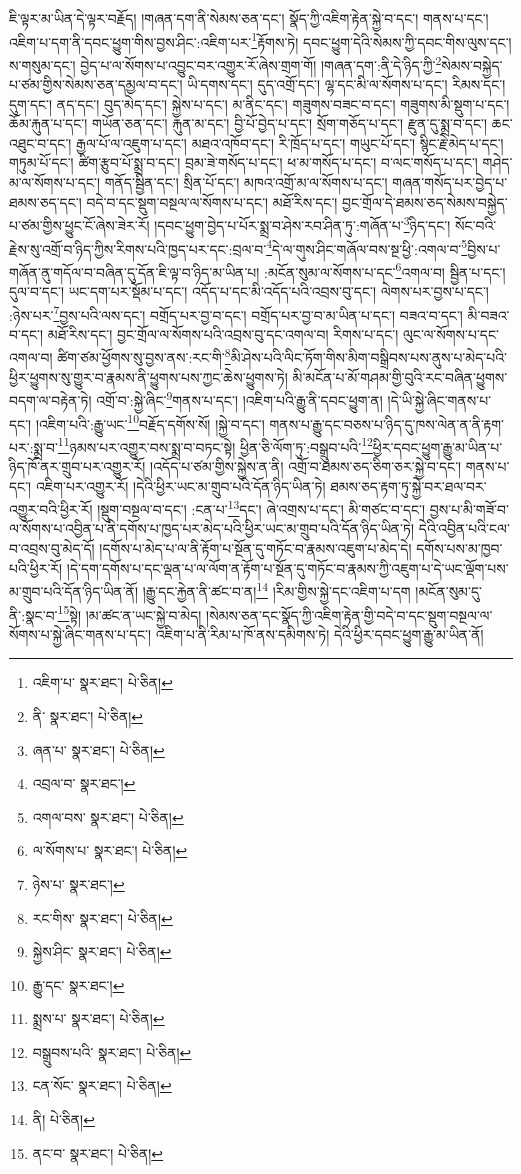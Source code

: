 ཇི་ལྟར་མ་ཡིན་དེ་ལྟར་བརྗོད། །གཞན་དག་ནི་སེམས་ཅན་དང་། སྣོད་ཀྱི་འཇིག་རྟེན་སྐྱེ་བ་དང་། གནས་པ་དང་། འཇིག་པ་དག་ནི་དབང་ཕྱུག་གིས་བྱས་ཤིང་:འཇིག་པར་\footnote{འཇིག་པ་  སྣར་ཐང་།  པེ་ཅིན། }རྟོགས་ཏེ། དབང་ཕྱུག་དེའི་སེམས་ཀྱི་དབང་གིས་ལུས་དང་། ས་གསུམ་དང་། བྱེད་པ་ལ་སོགས་པ་འབྱུང་བར་འགྱུར་རོ་ཞེས་གྲག་གོ། །གཞན་དག་:ནི་དེ་ཉིད་ཀྱི་\footnote{ནི་  སྣར་ཐང་།  པེ་ཅིན། }སེམས་བསྐྱེད་པ་ཙམ་གྱིས་སེམས་ཅན་དམྱལ་བ་དང་། ཡི་དགས་དང་། དུད་འགྲོ་དང་། ལྷ་དང་མི་ལ་སོགས་པ་དང་། རིམས་དང་། དུག་དང་། ནད་དང་། བུད་མེད་དང་། སྐྱེས་པ་དང་། མ་ནིང་དང་། གཟུགས་བཟང་བ་དང་། གཟུགས་མི་སྡུག་པ་དང་། ཆོམ་རྐུན་པ་དང་། གཡོན་ཅན་དང་། རྐུན་མ་དང་། བྱི་པོ་བྱེད་པ་དང་། སྲོག་གཅོད་པ་དང་། རྫུན་དུ་སྨྲ་བ་དང་། ཆང་འཐུང་བ་དང་། རྒྱལ་པོ་ལ་འཇུག་པ་དང་། མཐའ་འཁོབ་དང་། རི་ཁྲོད་པ་དང་། གཡུང་པོ་དང་། སྙིང་རྗེ་མེད་པ་དང་། གཏུམ་པོ་དང་། ཚིག་རྩུབ་པོ་སྨྲ་བ་དང་། བྲམ་ཟེ་གསོད་པ་དང་། ཕ་མ་གསོད་པ་དང་། བ་ལང་གསོད་པ་དང་། གཤེད་མ་ལ་སོགས་པ་དང་། གནོད་སྦྱིན་དང་། སྲིན་པོ་དང་། མཁའ་འགྲོ་མ་ལ་སོགས་པ་དང་། གཞན་གསོད་པར་བྱེད་པ་ཐམས་ཅད་དང་། བདེ་བ་དང་སྡུག་བསྔལ་ལ་སོགས་པ་དང་། མཐོ་རིས་དང་། བྱང་གྲོལ་དེ་ཐམས་ཅད་སེམས་བསྐྱེད་པ་ཙམ་གྱིས་ཕྱུང་ངོ་ཞེས་ཟེར་རོ། །དབང་ཕྱུག་བྱེད་པ་པོར་སྨྲ་བ་ཤེས་རབ་ཤིན་ཏུ་:གཞོན་པ་\footnote{ཞན་པ་  སྣར་ཐང་།  པེ་ཅིན། }ཉིད་དང་། སོང་བའི་རྗེས་སུ་འགྲོ་བ་ཉིད་ཀྱིས་རིགས་པའི་ཁྱད་པར་དང་:བྲལ་བ་\footnote{འབྲལ་བ་  སྣར་ཐང་། }དེ་ལ་གུས་ཤིང་གཞོལ་བས་སྔ་ཕྱི་:འགལ་བ་\footnote{འགལ་བས་  སྣར་ཐང་།  པེ་ཅིན། }བྱིས་པ་གཞོན་ནུ་གདོལ་བ་བཞིན་དུ་དོན་ཇི་ལྟ་བ་ཉིད་མ་ཡིན་པ། :མངོན་སུམ་ལ་སོགས་པ་དང་\footnote{ལ་སོགས་པ་  སྣར་ཐང་།  པེ་ཅིན། }འགལ་བ། སྦྱིན་པ་དང་། དུལ་བ་དང་། ཡང་དག་པར་སྡོམ་པ་དང་། འདོད་པ་དང་མི་འདོད་པའི་འབྲས་བུ་དང་། ལེགས་པར་བྱས་པ་དང་། :ཉེས་པར་\footnote{ཉེས་པ་  སྣར་ཐང་། }བྱས་པའི་ལས་དང་། བགྲོད་པར་བྱ་བ་དང་། བགྲོད་པར་བྱ་བ་མ་ཡིན་པ་དང་། བཟའ་བ་དང་། མི་བཟའ་བ་དང་། མཐོ་རིས་དང་། བྱང་གྲོལ་ལ་སོགས་པའི་འབྲས་བུ་དང་འགལ་བ། རིགས་པ་དང་། ལུང་ལ་སོགས་པ་དང་འགལ་བ། ཚིག་ཙམ་ཕྱོགས་སུ་བྱས་ནས་:རང་གི་\footnote{རང་གིས་  སྣར་ཐང་།  པེ་ཅིན། }མི་ཤེས་པའི་ལིང་ཏོག་གིས་མིག་བསྒྲིབས་པས་ནུས་པ་མེད་པའི་ཕྱིར་ཕྱུགས་སུ་གྱུར་བ་རྣམས་ནི་ཕྱུགས་པས་ཀྱང་ཆེས་ཕྱུགས་ཏེ། མི་མངོན་པ་མོ་གཤམ་གྱི་བུའི་རང་བཞིན་ཕྱུགས་བདག་ལ་བརྟེན་ཏེ། འགྲོ་བ་:སྐྱེ་ཞིང་\footnote{སྐྱེས་ཤིང་  སྣར་ཐང་།  པེ་ཅིན། }གནས་པ་དང་། །འཇིག་པའི་རྒྱུ་ནི་དབང་ཕྱུག་ན། །དེ་ཡི་སྐྱེ་ཞིང་གནས་པ་དང་། །འཇིག་པའི་:རྒྱུ་ཡང་\footnote{རྒྱུ་དང་  སྣར་ཐང་། }བརྗོད་དགོས་སོ། །སྐྱེ་བ་དང་། གནས་པ་རྒྱུ་དང་བཅས་པ་ཉིད་དུ་ཁས་ལེན་ན་ནི་རྟག་པར་:སྨྲ་བ་\footnote{སྨྲས་པ་  སྣར་ཐང་།  པེ་ཅིན། }ཉམས་པར་འགྱུར་བས་སྨྲ་བ་བཏང་སྟེ། ཕྱིན་ཅི་ལོག་ཏུ་:བསྒྲུབ་པའི་\footnote{བསྒྲུབས་པའི་  སྣར་ཐང་།  པེ་ཅིན། }ཕྱིར་དབང་ཕྱུག་རྒྱུ་མ་ཡིན་པ་ཉིད་ཁོ་ནར་གྲུབ་པར་འགྱུར་རོ། །འདོད་པ་ཙམ་གྱིས་སྐྱེས་ན་ནི། འགྲོ་བ་ཐམས་ཅད་ཅིག་ཅར་སྐྱེ་བ་དང་། གནས་པ་དང་། འཇིག་པར་འགྱུར་རོ། །དེའི་ཕྱིར་ཡང་མ་གྲུབ་པའི་དོན་ཉིད་ཡིན་ཏེ། ཐམས་ཅད་རྟག་ཏུ་སྐྱེ་བར་ཐལ་བར་འགྱུར་བའི་ཕྱིར་རོ། །སྡུག་བསྔལ་བ་དང་། :ངན་པ་\footnote{ངན་སོང་  སྣར་ཐང་།  པེ་ཅིན། }དང་། ཞེ་འགྲས་པ་དང་། མི་གཙང་བ་དང་། བྱས་པ་མི་གཟོ་བ་ལ་སོགས་པ་འབྱིན་པ་ནི་དགོས་པ་ཁྱད་པར་མེད་པའི་ཕྱིར་ཡང་མ་གྲུབ་པའི་དོན་ཉིད་ཡིན་ཏེ། དེའི་འབྱིན་པའི་ངལ་བ་འབྲས་བུ་མེད་དོ། །དགོས་པ་མེད་པ་ལ་ནི་རྟོག་པ་སྔོན་དུ་གཏོང་བ་རྣམས་འཇུག་པ་མེད་དེ། དགོས་པས་མ་ཁྱབ་པའི་ཕྱིར་རོ། །དེ་དག་དགོས་པ་དང་ལྡན་པ་ལ་ལོག་ན་རྟོག་པ་སྔོན་དུ་གཏོང་བ་རྣམས་ཀྱི་འཇུག་པ་དེ་ཡང་ལྡོག་པས་མ་གྲུབ་པའི་དོན་ཉིད་ཡིན་ནོ། །རྒྱུ་དང་རྐྱེན་ནི་ཚང་བ་ན།\footnote{ནི།  པེ་ཅིན། } །རིམ་གྱིས་སྐྱེ་དང་འཇིག་པ་དག །མངོན་སུམ་དུ་ནི་:སྣང་བ་\footnote{ནང་བ་  སྣར་ཐང་།  པེ་ཅིན། }སྟེ། །མ་ཚང་ན་ཡང་སྐྱེ་བ་མེད། །སེམས་ཅན་དང་སྣོད་ཀྱི་འཇིག་རྟེན་གྱི་བདེ་བ་དང་སྡུག་བསྔལ་ལ་སོགས་པ་སྐྱེ་ཞིང་གནས་པ་དང་། འཇིག་པ་ནི་རིམ་པ་ཁོ་ནས་དམིགས་ཏེ། དེའི་ཕྱིར་དབང་ཕྱུག་རྒྱུ་མ་ཡིན་ནོ། 